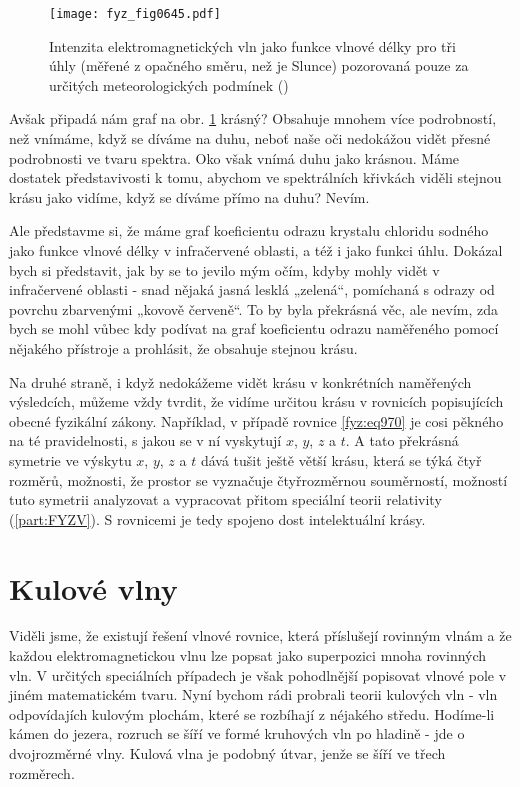     \begin{figure}[ht!] %
      \centering
      \texttt{[image: fyz\_fig0645.pdf]}
      \caption{Intenzita elektromagnetických vln jako funkce vlnové délky pro tři úhly (měřené z 
               opačného směru, než je Slunce) pozorovaná pouze za určitých meteorologických 
               podmínek (\cite[s.~362]{Feynman02})}
      \label{fyz:fig0645}
    \end{figure}

    Avšak připadá nám graf na obr. \ref{fyz:fig0645} krásný? Obsahuje mnohem více podrobností, než
    vnímáme, když se díváme na duhu, neboť naše oči nedokážou vidět přesné podrobnosti ve tvaru
    spektra. Oko však vnímá duhu jako krásnou. Máme dostatek představivosti k tomu, abychom ve
    spektrálních křivkách viděli stejnou krásu jako vidíme, když se díváme přímo na duhu? Nevím.
    
    Ale představme si, že máme graf koeficientu odrazu krystalu chloridu sodného jako funkce vlnové
    délky v infračervené oblasti, a též i jako funkci úhlu. Dokázal bych si představit, jak by se to
    jevilo mým očím, kdyby mohly vidět v infračervené oblasti - snad nějaká jasná lesklá „zelená“,
    pomíchaná s odrazy od povrchu zbarvenými „kovově červeně“. To by byla překrásná věc, ale nevím,
    zda bych se mohl vůbec kdy podívat na graf koeficientu odrazu  naměřeného pomocí
    nějakého přístroje a prohlásit, že obsahuje stejnou krásu.
    
    Na druhé straně, i když nedokážeme vidět krásu v konkrétních naměřených výsledcích, můžeme vždy
    tvrdit, že vidíme určitou krásu v rovnicích popisujících obecné fyzikální zákony. Například, v
    případě rovnice \eqref{fyz:eq970} je cosi pěkného na té pravidelnosti, s jakou se v ní vyskytují
    \(x\), \(y\), \(z\) a \(t\). A tato překrásná symetrie ve výskytu \(x\), \(y\), \(z\) a \(t\)
    dává tušit ještě větší krásu, která se týká čtyř rozměrů, možnosti, že prostor se vyznačuje
    čtyřrozměrnou souměrností, možností tuto symetrii analyzovat a vypracovat přitom speciální
    teorii relativity (\ref{part:FYZV}). S rovnicemi je tedy spojeno dost intelektuální krásy.    

  \section{Kulové vlny}\label{fyz:IIchapXXsecIV}   
    Viděli jsme, že existují řešení vlnové rovnice, která příslušejí rovinným vlnám a že každou
    elektromagnetickou vlnu lze popsat jako superpozici mnoha rovinných vln. V určitých speciálních
    případech je však pohodlnější popisovat vlnové pole v jiném matematickém tvaru. Nyní bychom rádi
    probrali teorii kulových vln - vln odpovídajích kulovým plochám, které se rozbíhají z néjakého
    středu. Hodíme-li kámen do jezera, rozruch se šíří ve formé kruhových vln po hladině - jde o
    dvojrozměrné vlny. Kulová vlna je podobný útvar, jenže se šíří ve třech rozměrech.

